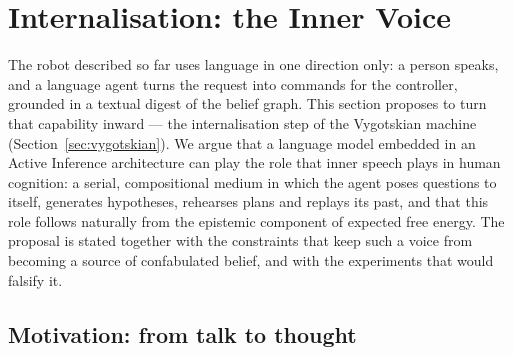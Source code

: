 %
%     
%     
%     

\section{Internalisation: the Inner Voice}
\label{sec:inner_speech}

The robot described so far uses language in one direction only: a person speaks, and a language agent turns
the request into commands for the controller, grounded in a textual digest of the belief graph. This section
proposes to turn that capability inward --- the internalisation step of the Vygotskian machine
(Section~\ref{sec:vygotskian}). We argue that a language model embedded in an Active Inference
architecture can play the role that inner speech plays in human cognition: a serial, compositional medium in
which the agent poses questions to itself, generates hypotheses, rehearses plans and replays its past, and that
this role follows naturally from the epistemic component of expected free energy. The proposal is stated
together with the constraints that keep such a voice from becoming a source of confabulated belief, and with the
experiments that would falsify it.

\subsection{Motivation: from talk to thought}
\label{sec:inner_speech:motivation}

